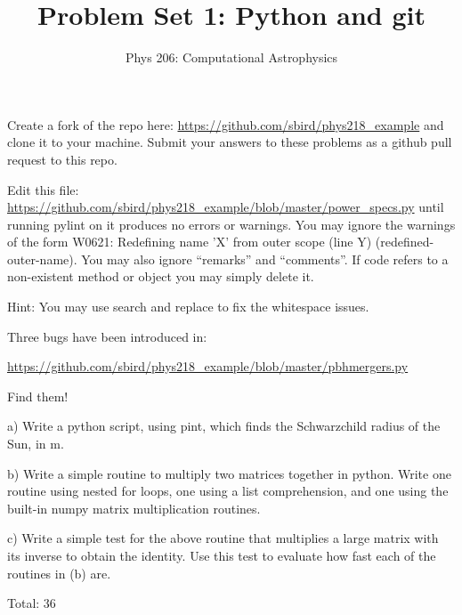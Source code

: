 \documentclass[10pt]{article}
\newenvironment{problem}[2][Problem]{\begin{trivlist}
\item[\hskip \labelsep {\bfseries #1}\hskip \labelsep {\bfseries #2}]}{\end{trivlist}}
\begin{document}
\title{Problem Set 1: Python and git}
\author{Phys 206: Computational Astrophysics}
\maketitle

\begin{problem}{1.0 Github (4)}
Create a fork of the repo here: \url{https://github.com/sbird/phys218_example}
 and clone it to your machine. Submit your answers to these problems as a github pull request to this repo.
\end{problem}

\begin{problem}{1.1 Cleanups (10)}
Edit this file: \url{https://github.com/sbird/phys218_example/blob/master/power_specs.py}
until running pylint on it produces no errors or warnings. You may ignore the warnings of the form W0621: Redefining name 'X' from outer scope (line Y) (redefined-outer-name). You may also ignore ``remarks'' and ``comments''. If code refers to a non-existent method or object you may simply delete it.

Hint: You may use search and replace to fix the whitespace issues.
\end{problem}

\begin{problem}{1.2 Find the bug (6)}
Three bugs have been introduced in:

\url{https://github.com/sbird/phys218_example/blob/master/pbhmergers.py}

Find them!
\end{problem}

\begin{problem}{1.3 Writing python (10)}

a) Write a python script, using pint, which finds the Schwarzchild radius of the Sun, in m.

b) Write a simple routine to multiply two matrices together in python. Write one routine using nested for loops, one using a list comprehension, and one using the built-in numpy matrix multiplication routines.

c) Write a simple test for the above routine that multiplies a large matrix with its inverse to obtain the identity. Use this test to evaluate how fast each of the routines in (b) are.
\end{problem}

Total: 36
\end{document}
